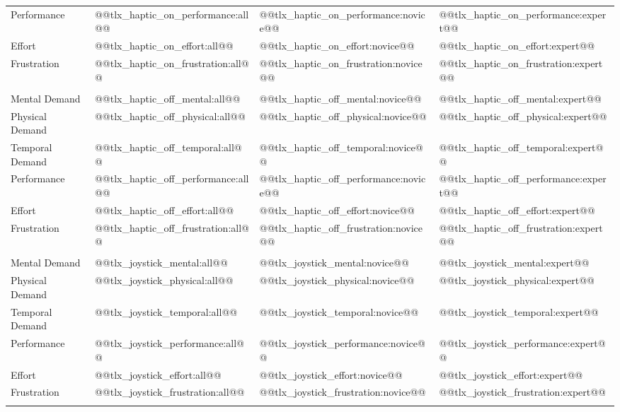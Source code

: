\begin{table}[!t]
\begin{tabular}{@{}p{}*{3}{>{\centering\arraybackslash}p{}}@{}}
Performance        & @@tlx_haptic_on_performance:all@@ & @@tlx_haptic_on_performance:novice@@ & @@tlx_haptic_on_performance:expert@@ \\
Effort             & @@tlx_haptic_on_effort:all@@ & @@tlx_haptic_on_effort:novice@@ & @@tlx_haptic_on_effort:expert@@ \\
Frustration        & @@tlx_haptic_on_frustration:all@@ & @@tlx_haptic_on_frustration:novice@@ & @@tlx_haptic_on_frustration:expert@@ \\
\addlinespace[2pt]
\multicolumn{4}{@{}l}{\hspace{1em}\textit{Haptic Off}}\\
Mental Demand      & @@tlx_haptic_off_mental:all@@ & @@tlx_haptic_off_mental:novice@@ & @@tlx_haptic_off_mental:expert@@ \\
Physical Demand    & @@tlx_haptic_off_physical:all@@ & @@tlx_haptic_off_physical:novice@@ & @@tlx_haptic_off_physical:expert@@ \\
Temporal Demand    & @@tlx_haptic_off_temporal:all@@ & @@tlx_haptic_off_temporal:novice@@ & @@tlx_haptic_off_temporal:expert@@ \\
Performance        & @@tlx_haptic_off_performance:all@@ & @@tlx_haptic_off_performance:novice@@ & @@tlx_haptic_off_performance:expert@@ \\
Effort             & @@tlx_haptic_off_effort:all@@ & @@tlx_haptic_off_effort:novice@@ & @@tlx_haptic_off_effort:expert@@ \\
Frustration        & @@tlx_haptic_off_frustration:all@@ & @@tlx_haptic_off_frustration:novice@@ & @@tlx_haptic_off_frustration:expert@@ \\
\addlinespace[2pt]
\multicolumn{4}{@{}l}{\hspace{1em}\textit{Joystick}}\\
Mental Demand      & @@tlx_joystick_mental:all@@ & @@tlx_joystick_mental:novice@@ & @@tlx_joystick_mental:expert@@ \\
Physical Demand    & @@tlx_joystick_physical:all@@ & @@tlx_joystick_physical:novice@@ & @@tlx_joystick_physical:expert@@ \\
Temporal Demand    & @@tlx_joystick_temporal:all@@ & @@tlx_joystick_temporal:novice@@ & @@tlx_joystick_temporal:expert@@ \\
Performance        & @@tlx_joystick_performance:all@@ & @@tlx_joystick_performance:novice@@ & @@tlx_joystick_performance:expert@@ \\
Effort             & @@tlx_joystick_effort:all@@ & @@tlx_joystick_effort:novice@@ & @@tlx_joystick_effort:expert@@ \\
Frustration        & @@tlx_joystick_frustration:all@@ & @@tlx_joystick_frustration:novice@@ & @@tlx_joystick_frustration:expert@@ \\
\addlinespace[6pt]


\end{tabular}
\end{table}
